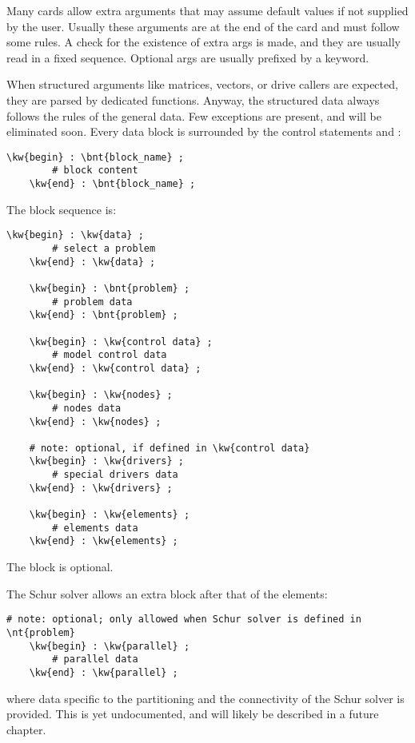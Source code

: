 Many cards allow extra arguments that may assume default values 
if not supplied by the user. 
Usually these arguments are at the end of the card
and must follow some rules. 
A check for the existence of extra args is made,
and they are usually read in a fixed sequence.
Optional args are usually prefixed by a keyword.

When structured arguments like matrices, vectors, or drive callers are
expected, they are parsed by dedicated functions.
Anyway, the structured data always follows the rules of the general data. 
Few exceptions are present, and will be eliminated soon.
Every data block is surrounded by the control statements  and
:
\begin{Verbatim}[commandchars=\\\{\}]
    \kw{begin} : \bnt{block_name} ;
        # block content
    \kw{end} : \bnt{block_name} ;
\end{Verbatim}
The block sequence is:
\begin{Verbatim}[commandchars=\\\{\}]
    \kw{begin} : \kw{data} ;
        # select a problem
    \kw{end} : \kw{data} ;

    \kw{begin} : \bnt{problem} ;
        # problem data
    \kw{end} : \bnt{problem} ;

    \kw{begin} : \kw{control data} ;
        # model control data
    \kw{end} : \kw{control data} ;

    \kw{begin} : \kw{nodes} ;
        # nodes data
    \kw{end} : \kw{nodes} ;

    # note: optional, if defined in \kw{control data}
    \kw{begin} : \kw{drivers} ;
        # special drivers data
    \kw{end} : \kw{drivers} ;

    \kw{begin} : \kw{elements} ;
        # elements data
    \kw{end} : \kw{elements} ;
\end{Verbatim}
The  block is optional.

The Schur solver allows an extra block after that of the elements:
\begin{Verbatim}[commandchars=\\\{\}]
    # note: optional; only allowed when Schur solver is defined in \nt{problem}
    \kw{begin} : \kw{parallel} ;
        # parallel data
    \kw{end} : \kw{parallel} ;
\end{Verbatim}
where data specific to the partitioning and the connectivity
of the Schur solver is provided.
This is yet undocumented, and will likely be described 
in a future chapter.

